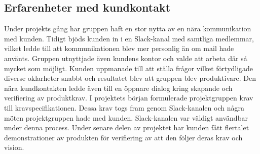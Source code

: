\subsection{Erfarenheter med kundkontakt}
Under projekts gång har gruppen haft en stor nytta av en nära kommunikation med kunden. Tidigt bjöds kunden in i en Slack-kanal med samtliga medlemmar, vilket ledde till att kommunikationen blev mer personlig än om mail hade använts. Gruppen utnyttjade även kundens kontor och valde att arbeta där så mycket som möjligt. Kunden uppmanade till att ställa frågor vilket förtydligade diverse oklarheter snabbt och resultatet blev att gruppen blev produktivare. Den nära kundkontakten ledde även till en öppnare dialog kring skapande och verifiering av produktkrav. I projektets början formulerade projektgruppen krav till kravspecifikationen. Dessa krav togs fram genom Slack-kanalen och några möten projektgruppen hade med kunden. Slack-kanalen var väldigt användbar under denna process. Under senare delen av projektet har kunden fått flertalet demonstrationer av produkten för verifiering av att den följer deras krav och vision.
